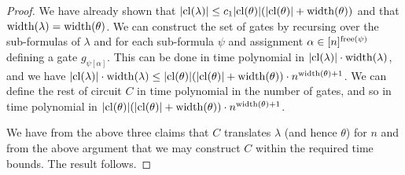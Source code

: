 \documentclass[../main/thesis.tex]{subfiles}
\begin{document}
\begin{proof}
We have already shown that $\vert \mathrm{cl}(\lambda) \vert \leq c_1\vert \mathrm{cl}(\theta)
\vert (\vert \mathrm{cl}(\theta) \vert + \mathrm{width}(\theta))$ and that $\mathrm{width}(\lambda) =
\mathrm{width}(\theta)$. We can construct the set of gates by recursing over the
sub-formulas of $\lambda$ and for each sub-formula $\psi$ and assignment $\alpha
\in [n]^{\mathrm{free}(\psi)}$ defining a gate $g_{\psi[\alpha]}$. This can be done in
time polynomial in $\vert \mathrm{cl}(\lambda) \vert \cdot \mathrm{width}(\lambda)$, and we
have $\vert \mathrm{cl}(\lambda) \vert \cdot \mathrm{width}(\lambda) \leq \vert \mathrm{cl}(\theta)
\vert (\vert \mathrm{cl}(\theta) \vert + \mathrm{width}(\theta)) \cdot n^{\mathrm{width}(\theta) +
  1}$. We can define the rest of circuit $C$ in time polynomial in the number of
gates, and so in time polynomial in $\vert \mathrm{cl}(\theta) \vert (\vert \mathrm{cl}(\theta)
\vert + \mathrm{width}(\theta)) \cdot n^{\mathrm{width}(\theta) + 1}$.

We have from the above three claims that $C$ translates $\lambda$ (and hence
$\theta$) for $n$ and from the above argument that we may construct $C$ within
the required time bounds. The result follows.




\end{proof}
\end{document}
